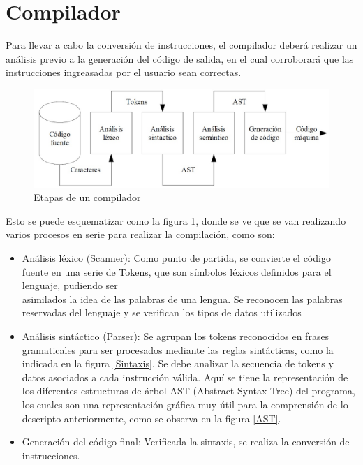 \documentclass[12pt,a4paper]{article}
\begin{document}
    \section{Compilador}
    Para llevar a cabo la conversión de instrucciones, el compilador deberá realizar un análisis previo a la generación del código de salida, en el cual corroborará que las instrucciones ingreasadas por el usuario sean correctas.
	\begin{figure}
	\centering
	\includegraphics[width=0.7\linewidth]{./analisis}
    \caption{Etapas de un compilador}
    \label{etapas_del_compilador}
	\end{figure}
    Esto se puede esquematizar como la figura \ref{etapas_del_compilador}, donde se ve que se van realizando varios procesos en serie para realizar la compilación, como son:
    \begin{itemize}
		\item	Análisis léxico (Scanner): Como punto de partida, se convierte el código fuente en una serie de Tokens, que son símbolos léxicos definidos para el lenguaje, pudiendo ser\\
        		asimilados la idea de las palabras de una lengua.
        		Se reconocen las palabras reservadas del lenguaje y se verifican los tipos de datos utilizados
                
		\item	Análisis sintáctico (Parser): Se agrupan los tokens reconocidos en frases gramaticales para ser procesados mediante las reglas sintácticas, como la indicada en la figura \ref{Sintaxis}.
        		Se debe analizar la secuencia de tokens y datos asociados a cada instrucción válida.
                Aquí se tiene la representación de los diferentes estructuras de árbol AST (Abstract Syntax Tree) del programa, los cuales son una representación gráfica muy útil para la comprensión de lo descripto anteriormente, como se observa en la figura \ref{AST}.
                
		\item	Generación del código final: Verificada la sintaxis, se realiza la conversión de instrucciones.

	\end{itemize}
    
\end{document}
